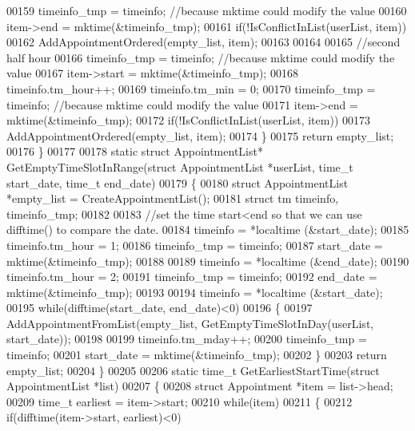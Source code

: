 \begin{DoxyCode}
00159         timeinfo\_tmp = timeinfo;    \textcolor{comment}{//because mktime could modify the value}
00160         item->end = mktime(&timeinfo\_tmp);
00161         \textcolor{keywordflow}{if}(!IsConflictInList(userList, item))
00162             AddAppointmentOrdered(empty\_list, item);
00163 
00164 
00165         \textcolor{comment}{//second half hour}
00166         timeinfo\_tmp = timeinfo;    \textcolor{comment}{//because mktime could modify the value}
00167         item->start = mktime(&timeinfo\_tmp);
00168         timeinfo.tm\_hour++;
00169         timeinfo.tm\_min = 0;
00170         timeinfo\_tmp = timeinfo;    \textcolor{comment}{//because mktime could modify the value}
00171         item->end = mktime(&timeinfo\_tmp);
00172         \textcolor{keywordflow}{if}(!IsConflictInList(userList, item))
00173             AddAppointmentOrdered(empty\_list, item);
00174     \}
00175     \textcolor{keywordflow}{return} empty\_list;
00176 \}
00177 
00178 \textcolor{keyword}{static} \textcolor{keyword}{struct }AppointmentList* GetEmptyTimeSlotInRange(\textcolor{keyword}{struct} AppointmentList *userList, time\_t start\_date,
       time\_t end\_date)
00179 \{
00180     \textcolor{keyword}{struct }AppointmentList *empty\_list = CreateAppointmentList();
00181     \textcolor{keyword}{struct }tm timeinfo, timeinfo\_tmp;
00182 
00183     \textcolor{comment}{//set the time start<end so that we can use difftime() to compare the date.}
00184     timeinfo = *localtime (&start\_date);
00185     timeinfo.tm\_hour = 1;
00186     timeinfo\_tmp = timeinfo;
00187     start\_date = mktime(&timeinfo\_tmp);
00188 
00189     timeinfo = *localtime (&end\_date);
00190     timeinfo.tm\_hour = 2;
00191     timeinfo\_tmp = timeinfo;
00192     end\_date = mktime(&timeinfo\_tmp);
00193 
00194     timeinfo = *localtime (&start\_date);
00195     \textcolor{keywordflow}{while}(difftime(start\_date, end\_date)<0)
00196     \{
00197         AddAppointmentFromList(empty\_list, GetEmptyTimeSlotInDay(userList, start\_date));
00198 
00199         timeinfo.tm\_mday++;
00200         timeinfo\_tmp = timeinfo;
00201         start\_date = mktime(&timeinfo\_tmp);
00202     \}
00203     \textcolor{keywordflow}{return} empty\_list;
00204 \}
00205 
00206 \textcolor{keyword}{static} time\_t GetEarliestStartTime(\textcolor{keyword}{struct} AppointmentList *list)
00207 \{
00208     \textcolor{keyword}{struct }Appointment *item = list->head;
00209     time\_t earliest = item->start;
00210     \textcolor{keywordflow}{while}(item)
00211     \{
00212         \textcolor{keywordflow}{if}(difftime(item->start, earliest)<0)

\end{DoxyCode}
